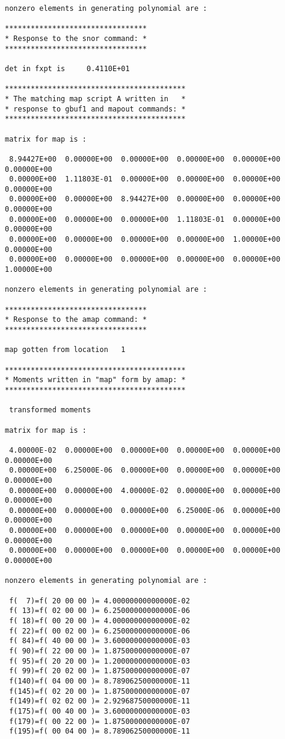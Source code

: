 \begin{footnotesize}
\begin{verbatim}
nonzero elements in generating polynomial are :

*********************************
* Response to the snor command: *
*********************************

det in fxpt is     0.4110E+01

******************************************
* The matching map script A written in   *
* response to gbuf1 and mapout commands: *
******************************************

matrix for map is :

 8.94427E+00  0.00000E+00  0.00000E+00  0.00000E+00  0.00000E+00  0.00000E+00
 0.00000E+00  1.11803E-01  0.00000E+00  0.00000E+00  0.00000E+00  0.00000E+00
 0.00000E+00  0.00000E+00  8.94427E+00  0.00000E+00  0.00000E+00  0.00000E+00
 0.00000E+00  0.00000E+00  0.00000E+00  1.11803E-01  0.00000E+00  0.00000E+00
 0.00000E+00  0.00000E+00  0.00000E+00  0.00000E+00  1.00000E+00  0.00000E+00
 0.00000E+00  0.00000E+00  0.00000E+00  0.00000E+00  0.00000E+00  1.00000E+00

nonzero elements in generating polynomial are :

*********************************
* Response to the amap command: *
*********************************

map gotten from location   1

******************************************
* Moments written in "map" form by amap: *
******************************************

 transformed moments

matrix for map is :

 4.00000E-02  0.00000E+00  0.00000E+00  0.00000E+00  0.00000E+00  0.00000E+00
 0.00000E+00  6.25000E-06  0.00000E+00  0.00000E+00  0.00000E+00  0.00000E+00
 0.00000E+00  0.00000E+00  4.00000E-02  0.00000E+00  0.00000E+00  0.00000E+00
 0.00000E+00  0.00000E+00  0.00000E+00  6.25000E-06  0.00000E+00  0.00000E+00
 0.00000E+00  0.00000E+00  0.00000E+00  0.00000E+00  0.00000E+00  0.00000E+00
 0.00000E+00  0.00000E+00  0.00000E+00  0.00000E+00  0.00000E+00  0.00000E+00

nonzero elements in generating polynomial are :

 f(  7)=f( 20 00 00 )= 4.00000000000000E-02
 f( 13)=f( 02 00 00 )= 6.25000000000000E-06
 f( 18)=f( 00 20 00 )= 4.00000000000000E-02
 f( 22)=f( 00 02 00 )= 6.25000000000000E-06
 f( 84)=f( 40 00 00 )= 3.60000000000000E-03
 f( 90)=f( 22 00 00 )= 1.87500000000000E-07
 f( 95)=f( 20 20 00 )= 1.20000000000000E-03
 f( 99)=f( 20 02 00 )= 1.87500000000000E-07
 f(140)=f( 04 00 00 )= 8.78906250000000E-11
 f(145)=f( 02 20 00 )= 1.87500000000000E-07
 f(149)=f( 02 02 00 )= 2.92968750000000E-11
 f(175)=f( 00 40 00 )= 3.60000000000000E-03
 f(179)=f( 00 22 00 )= 1.87500000000000E-07
 f(195)=f( 00 04 00 )= 8.78906250000000E-11


\end{verbatim}
\end{footnotesize}
